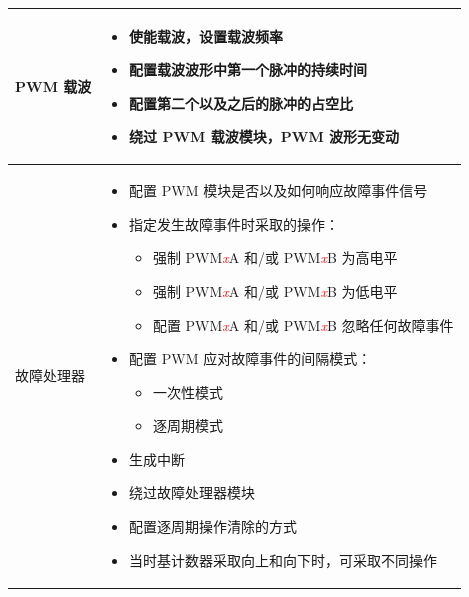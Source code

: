 \begin{longtable}[c]{|p{4cm}|p{11cm}|}
    \multirow{5}{*}{PWM 载波} &
    \vspace{-1em}\begin{itemize}
        \item 使能载波，设置载波频率
        \item 配置载波波形中第一个脉冲的持续时间
        \item 配置第二个以及之后的脉冲的占空比
        \item 绕过 PWM 载波模块，PWM 波形无变动
    \vspace{-1em}\end{itemize}\\\hline
    
    \multirow{13}{*}{故障处理器} &
    \vspace{-1em}\begin{itemize}    
        \item 配置 PWM 模块是否以及如何响应故障事件信号
        \item 指定发生故障事件时采取的操作：
        \begin{itemize}
            \item 强制 PWM\textcolor{red}{\it{x}}A 和/或 PWM\textcolor{red}{\it{x}}B 为高电平
            \item 强制 PWM\textcolor{red}{\it{x}}A 和/或 PWM\textcolor{red}{\it{x}}B 为低电平
            \item 配置 PWM\textcolor{red}{\it{x}}A 和/或 PWM\textcolor{red}{\it{x}}B 忽略任何故障事件
        \end{itemize}
        \item 配置 PWM 应对故障事件的间隔模式：
        \begin{itemize}
            \item 一次性模式
            \item 逐周期模式
        \end{itemize}
        \item 生成中断
        \item 绕过故障处理器模块
        \item 配置逐周期操作清除的方式
        \item 当时基计数器采取向上和向下时，可采取不同操作
\vspace{-1em}
    \end{itemize}\\\hline
    
\end{longtable}
